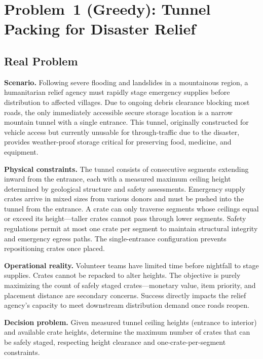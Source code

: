 \documentclass[sigconf]{acmart}
\begin{document}
\section{Problem~1 (Greedy): Tunnel Packing for Disaster Relief}
\label{sec:greedy}

\subsection{Real Problem}
\label{subsec:real-problem-greedy}

\textbf{Scenario.}
Following severe flooding and landslides in a mountainous region, a humanitarian relief agency must rapidly stage emergency supplies before distribution to affected villages. Due to ongoing debris clearance blocking most roads, the only immediately accessible secure storage location is a narrow mountain tunnel with a single entrance. This tunnel, originally constructed for vehicle access but currently unusable for through-traffic due to the disaster, provides weather-proof storage critical for preserving food, medicine, and equipment.

\textbf{Physical constraints.}
The tunnel consists of consecutive segments extending inward from the entrance, each with a measured maximum ceiling height determined by geological structure and safety assessments. Emergency supply crates arrive in mixed sizes from various donors and must be pushed into the tunnel from the entrance. A crate can only traverse segments whose ceilings equal or exceed its height—taller crates cannot pass through lower segments. Safety regulations permit at most one crate per segment to maintain structural integrity and emergency egress paths. The single-entrance configuration prevents repositioning crates once placed.

\textbf{Operational reality.}
Volunteer teams have limited time before nightfall to stage supplies. Crates cannot be repacked to alter heights. The objective is purely maximizing the count of safely staged crates—monetary value, item priority, and placement distance are secondary concerns. Success directly impacts the relief agency's capacity to meet downstream distribution demand once roads reopen.

\textbf{Decision problem.}
Given measured tunnel ceiling heights (entrance to interior) and available crate heights, determine the maximum number of crates that can be safely staged, respecting height clearance and one-crate-per-segment constraints.
\end{document}
